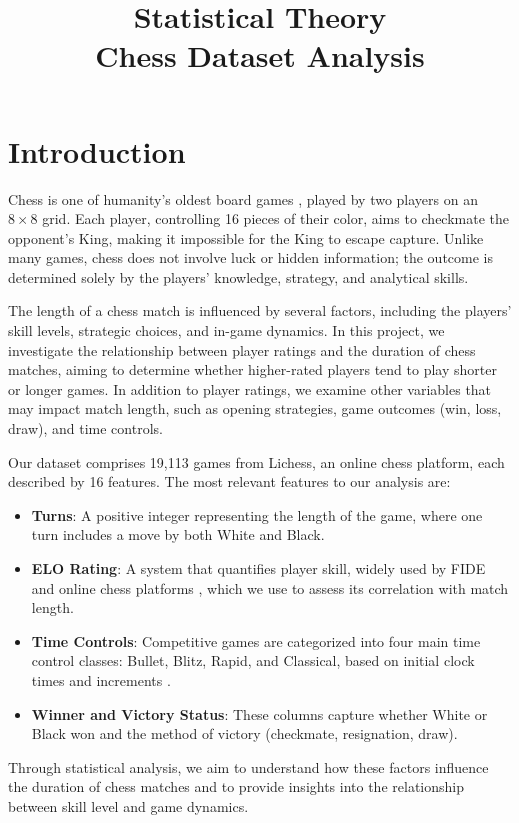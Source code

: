 \documentclass[conference]{IEEEtran}
\title{
Statistical Theory\\
Chess Dataset Analysis
}
\author{
   \IEEEauthorblockN{Dor Boker, Itamar Nakar}
   \IEEEauthorblockA{
      I.D: 209271279 , 325829000\\
      Email: dorboker@gmail.com, itamar.nakar@gmail.com
   }
}
\begin{document}
\maketitle

\section{Introduction}
Chess is one of humanity's oldest board games \cite{chesswiki}, played by two players on an $8\times8$ grid. Each player, controlling 16 pieces of their color, aims to checkmate the opponent's King, making it impossible for the King to escape capture. Unlike many games, chess does not involve luck or hidden information; the outcome is determined solely by the players' knowledge, strategy, and analytical skills.

The length of a chess match is influenced by several factors, including the players' skill levels, strategic choices, and in-game dynamics. In this project, we investigate the relationship between player ratings and the duration of chess matches, aiming to determine whether higher-rated players tend to play shorter or longer games. In addition to player ratings, we examine other variables that may impact match length, such as opening strategies, game outcomes (win, loss, draw), and time controls.

Our dataset \cite{dataset} comprises 19,113 games from Lichess, an online chess platform, each described by 16 features. The most relevant features to our analysis are: \begin{itemize} \item \textbf{Turns}: A positive integer representing the length of the game, where one turn includes a move by both White and Black. \item \textbf{ELO Rating}: A system that quantifies player skill, widely used by FIDE and online chess platforms \cite{ELO}, which we use to assess its correlation with match length. \item \textbf{Time Controls}: Competitive games are categorized into four main time control classes: Bullet, Blitz, Rapid, and Classical, based on initial clock times and increments \cite{time}. \item \textbf{Winner and Victory Status}: These columns capture whether White or Black won and the method of victory (checkmate, resignation, draw). \end{itemize} Through statistical analysis, we aim to understand how these factors influence the duration of chess matches and to provide insights into the relationship between skill level and game dynamics. 
\end{document}
